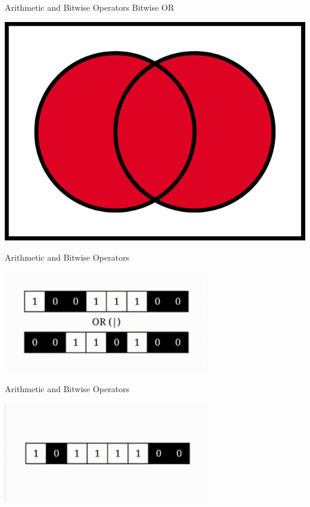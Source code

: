 \documentclass{beamer}
\begin{document}
    \begin{frame}{Arithmetic and Bitwise Operators}
        \color{blue} \Large Bitwise  OR\\
        \color{black} \normalsize \vskip 10pt
        \begin{center}
            \includegraphics[scale = 0.7]{OR.png}
        \end{center}
    \end{frame}
    
    \begin{frame}{Arithmetic and Bitwise Operators}
        \begin{center}
            \includegraphics[scale = 0.8]{OR Before.png}
        \end{center}
    \end{frame}
    
    \begin{frame}{Arithmetic and Bitwise Operators}
        \begin{center}
            \includegraphics[scale = 0.8]{OR After.png}
        \end{center}
    \end{frame}
    
\end{document}
